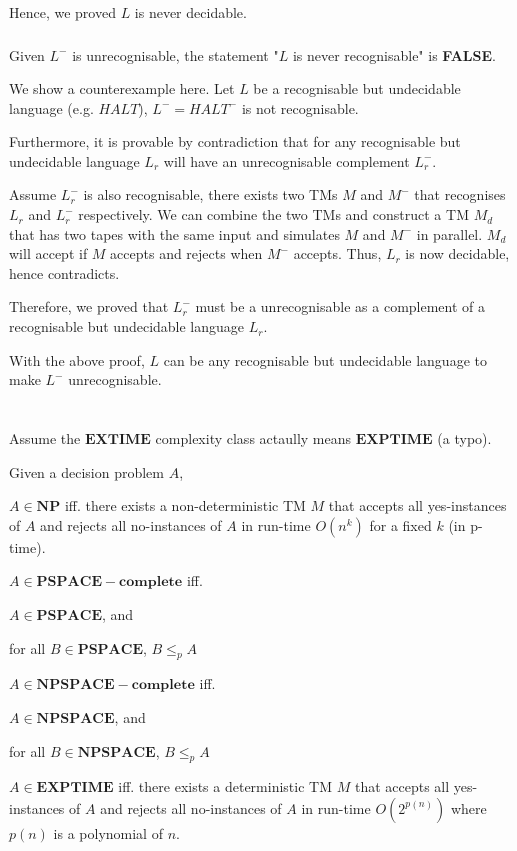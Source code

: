 \documentclass[12pt]{article}
\newcommand{\SubItem}[1]{
    {\setlength\itemindent{15pt} \item[-] #1}
}
\begin{document}
Hence, we proved $L$ is never decidable.

\subsubsection{}
Given $L^-$ is unrecognisable, the statement "$L$ is never recognisable" is \textbf{FALSE}.

We show a counterexample here. Let $L$ be a recognisable but undecidable language (e.g. $HALT$), $L^- = HALT^-$ is not recognisable.

Furthermore, it is provable by contradiction that for any recognisable but undecidable language $L_r$ will have an unrecognisable complement $L_r^-$. 

Assume $L_r^-$ is also recognisable, there exists two TMs $M$ and $M^-$ that recognises $L_r$ and $L_r^-$ respectively. We can combine the two TMs and construct a TM $M_d$ that has two tapes with the same input and simulates $M$ and $M^-$ in parallel. $M_d$ will accept if $M$ accepts and rejects when $M^-$ accepts. Thus, $L_r$ is now decidable, hence contradicts. 

Therefore, we proved that $L_r^-$ must be a unrecognisable as a complement of a recognisable but undecidable language $L_r$.

With the above proof, $L$ can be any recognisable but undecidable language to make $L^-$ unrecognisable.


\section{}

\subsection{}
Assume the $\pmb{EXTIME}$ complexity class actaully means $\pmb{EXPTIME}$ (a typo).

Given a decision problem $A$,

\begin{itemize}
    \item $A \in \pmb{NP}$ iff. there exists a non-deterministic TM $M$ that accepts all yes-instances of $A$ and rejects all no-instances of $A$ in run-time $O(n^k)$ for a fixed $k$ (in p-time).
    \item $A \in \pmb{PSPACE-complete}$ iff.
    \SubItem{$A \in \pmb{PSPACE}$, and} 
    \SubItem{for all $B \in \pmb{PSPACE}$, $B \leq_p A$}
    \item $A \in \pmb{NPSPACE-complete}$ iff.
    \SubItem{$A \in \pmb{NPSPACE}$, and} 
    \SubItem{for all $B \in \pmb{NPSPACE}$, $B \leq_p A$}
    \item $A \in \pmb{EXPTIME}$ iff. there exists a deterministic TM $M$ that accepts all yes-instances of $A$ and rejects all no-instances of $A$ in run-time $O(2^{p(n)})$ where $p(n)$ is a polynomial of $n$. 
\end{itemize}
\end{document}
